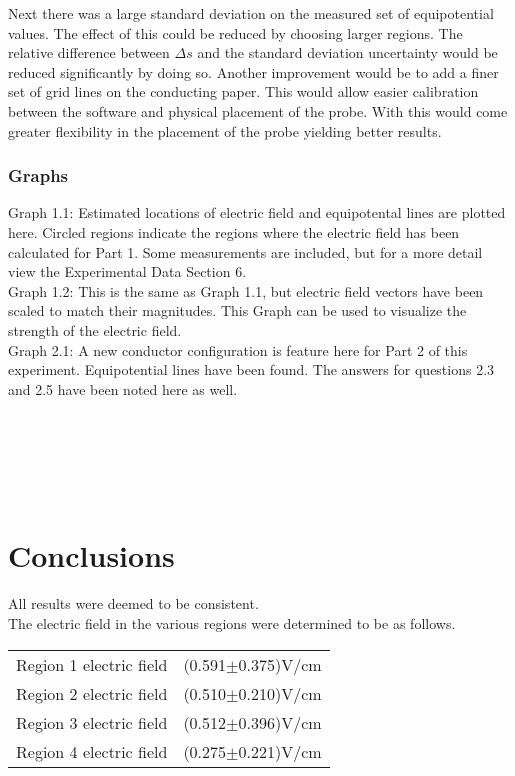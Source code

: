 \documentclass{article}
\begin{document}
Next there was a large standard deviation on the measured set of equipotential values. The effect of this could be reduced by choosing larger regions. The relative difference between $\Delta s$ and the standard deviation uncertainty would be reduced significantly by doing so. Another improvement would be to add a finer set of grid lines on the conducting paper. This would allow easier calibration between the software and physical placement of the probe. With this would come greater flexibility in the placement of the probe yielding better results.\\

\subsubsection{Graphs}
Graph 1.1: Estimated locations of electric field and equipotental lines are plotted here. Circled regions indicate the regions where the electric field has been calculated for Part 1. Some measurements are included, but for a more detail view the Experimental Data Section 6.\\

Graph 1.2: This is the same as Graph 1.1, but electric field vectors have been scaled to match their magnitudes. This Graph can be used to visualize the strength of the electric field.\\

Graph 2.1: A new conductor configuration is feature here for Part 2 of this experiment. Equipotential lines have been found. The answers for questions 2.3 and 2.5 have been noted here as well.\\\\\\\\\\\\
\section{Conclusions}
All results were deemed to be consistent.\\

The electric field in the various regions were determined to be as follows.\\
\begin{tabular}{ll}
Region 1 electric field&(0.591$\pm$0.375)V/cm\\
Region 2 electric field&(0.510$\pm$0.210)V/cm\\
Region 3 electric field&(0.512$\pm$0.396)V/cm\\
Region 4 electric field&(0.275$\pm$0.221)V/cm\\
\end{tabular}
\end{document}
